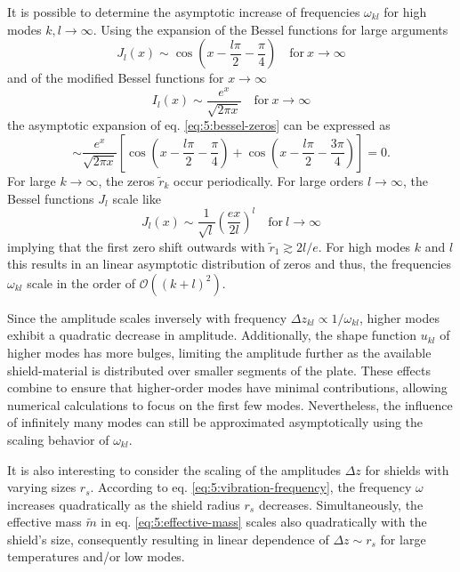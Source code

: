 It is possible to determine the asymptotic increase of frequencies $\omega_{kl}$ for high modes $k,l \rightarrow \infty$.
Using the expansion of the Bessel functions for large arguments \cite[eq. 10.17.3]{DLMF}
\begin{equation}
  J_l(x) \sim \cos(x - \frac{l \pi}{2} - \frac{\pi}{4}) \quad \text{for} \ x \rightarrow \infty
\end{equation}
and of the modified Bessel functions for $x\rightarrow\infty$ \cite[eq. 10.40.1]{DLMF}
\begin{equation}
  I_l(x) \sim \frac{e^x}{\sqrt{2\pi x}} \quad \text{for} \ x \rightarrow \infty
\end{equation}
the asymptotic expansion of eq. \eqref{eq:5:bessel-zeros} can be expressed as
\begin{equation}
  \sim \frac{e^x}{\sqrt{2\pi x}} \left[\cos(x - \frac{l \pi}{2} - \frac{\pi}{4}) + \cos(x - \frac{l \pi}{2} - \frac{3 \pi}{4})\right] = 0 .
\end{equation}
For large $k\rightarrow\infty$, the zeros $\tilde{r}_k$ occur periodically.
For large orders $l\rightarrow \infty$, the Bessel functions $J_l$ scale like \cite[eq. 10.19.1]{DLMF}
\begin{equation}
  J_l(x) \sim \frac{1}{\sqrt{l}} \left(\frac{ex}{2l}\right)^l \quad \text{for} \ l \rightarrow \infty
\end{equation}
implying that the first zero shift outwards with $\tilde{r}_1 \gtrsim 2l/e$.
For high modes $k$ and $l$ this results in an linear asymptotic distribution of zeros and thus, the frequencies $\omega_{kl}$ scale in the order of $\mathcal{O}((k + l)^2)$.

Since the amplitude scales inversely with frequency $\Delta z_{kl} \propto 1/\omega_{kl}$, higher modes exhibit a quadratic decrease in amplitude.
Additionally, the shape function $u_{kl}$ of higher modes has more bulges, limiting the amplitude further as the available shield-material is distributed over smaller segments of the plate.
These effects combine to ensure that higher-order modes have minimal contributions, allowing numerical calculations to focus on the first few modes.
Nevertheless, the influence of infinitely many modes can still be approximated asymptotically using the scaling behavior of $\omega_{kl}$.

It is also interesting to consider the scaling of the amplitudes $\Delta z$ for shields with varying sizes $r_s$.
According to eq. \eqref{eq:5:vibration-frequency}, the frequency $\omega$ increases quadratically as the shield radius $r_s$ decreases.
Simultaneously, the effective mass $\tilde{m}$ in eq. \eqref{eq:5:effective-mass} scales also quadratically with the shield's size, consequently resulting in linear dependence of $\Delta z \sim r_s$ for large temperatures and/or low modes.